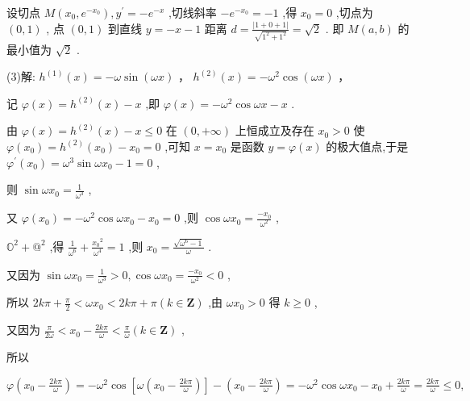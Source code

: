 \documentclass[10pt]{article}
\newcommand*\circled[1]{\tikz[baseline=(char.base)]{\node[shape=circle,draw,inner sep=1.5pt] (char) {\small #1};}}
\begin{document}
设切点 \(M\left( {{x}_{0},{e}^{-{x}_{0}}}\right) ,{y}^{\prime } =  - {e}^{-x}\) ,切线斜率 \(- {e}^{-{x}_{0}} =  - 1\) ,得 \({x}_{0} = 0\) ,切点为 \(\left( {0,1}\right)\) , 点 \(\left( {0,1}\right)\) 到直线 \(y =  - x - 1\) 距离 \(d = \frac{\left| 1 + 0 + 1\right| }{\sqrt{{1}^{2} + {1}^{2}}} = \sqrt{2}\) . 即 \(M\left( {a,b}\right)\) 的最小值为 \(\sqrt{2}\) .

(3)解: \({h}^{\left( 1\right) }\left( x\right)  =  - \omega \sin \left( {\omega x}\right)\) ， \({h}^{\left( 2\right) }\left( x\right)  =  - {\omega }^{2}\cos \left( {\omega x}\right)\) ，

记 \(\varphi \left( x\right)  = {h}^{\left( 2\right) }\left( x\right)  - x\) ,即 \(\varphi \left( x\right)  =  - {\omega }^{2}\cos {\omega x} - x\) .

由 \(\varphi \left( x\right)  = {h}^{\left( 2\right) }\left( x\right)  - x \leq  0\) 在 \(\left( {0, + \infty }\right)\) 上恒成立及存在 \({x}_{0} > 0\) 使 \(\varphi \left( {x}_{0}\right)  = {h}^{\left( 2\right) }\left( {x}_{0}\right)  - {x}_{0} = 0\) ,可知 \(x = {x}_{0}\) 是函数 \(y = \varphi \left( x\right)\) 的极大值点,于是 \({\varphi }^{\prime }\left( {x}_{0}\right)  = {\omega }^{3}\sin \omega {x}_{0} - 1 = 0\) ,

则 \(\sin \omega {x}_{0} = \frac{1}{{\omega }^{3}}\)  \circled{1} ,

又 \(\varphi \left( {x}_{0}\right)  =  - {\omega }^{2}\cos \omega {x}_{0} - {x}_{0} = 0\) ,则 \(\cos \omega {x}_{0} = \frac{-{x}_{0}}{{\omega }^{2}}\)  \circled{2} ,

\({\mathbb{O}}^{2} + {@}^{2}\) ,得 \(\frac{1}{{\omega }^{6}} + \frac{{x}_{0}{}^{2}}{{\omega }^{4}} = 1\) ,则 \({x}_{0} = \frac{\sqrt{{\omega }^{6} - 1}}{\omega }\) .

又因为 \(\sin \omega {x}_{0} = \frac{1}{{\omega }^{3}} > 0,\cos \omega {x}_{0} = \frac{-{x}_{0}}{{\omega }^{2}} < 0\) ,

所以 \({2k\pi } + \frac{\pi }{2} < \omega {x}_{0} < {2k\pi } + \pi \left( {k \in  \mathbf{Z}}\right)\) ,由 \(\omega {x}_{0} > 0\) 得 \(k \geq  0\) ,

又因为 \(\frac{\pi }{2\omega } < {x}_{0} - \frac{2k\pi }{\omega } < \frac{\pi }{\omega }\left( {k \in  \mathbf{Z}}\right)\) ,

所以

\(\varphi \left( {{x}_{0} - \frac{2k\pi }{\omega }}\right)  =  - {\omega }^{2}\cos \left\lbrack  {\omega \left( {{x}_{0} - \frac{2k\pi }{\omega }}\right) }\right\rbrack   - \left( {{x}_{0} - \frac{2k\pi }{\omega }}\right)  =  - {\omega }^{2}\cos \omega {x}_{0} - {x}_{0} + \frac{2k\pi }{\omega } = \frac{2k\pi }{\omega } \leq  0,\)
\end{document}
